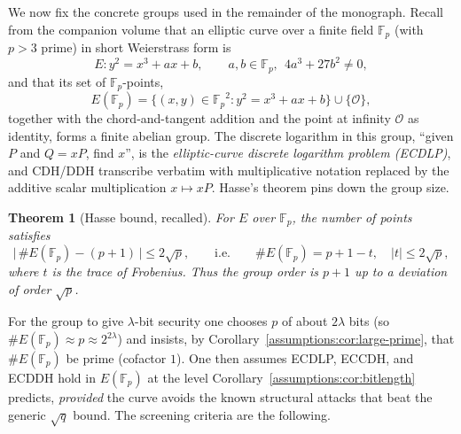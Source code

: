\documentclass[11pt,a4paper]{article}
\newtheorem{theorem}{Theorem}[section]
\theoremstyle{definition}
\theoremstyle{remark}
\newcommand{\Fp}{\ensuremath{\mathbb{F}_{p}}}
\begin{document}
We now fix the concrete groups used in the remainder of the monograph. Recall from the companion volume that an elliptic curve over a finite field \(\Fp\) (with \(p > 3\) prime) in short Weierstrass form is
\[
E \colon y^2 = x^3 + ax + b, \qquad a, b \in \Fp,\ \ 4a^3 + 27 b^2 \ne 0,
\]
and that its set of \(\Fp\)-points,
\[
E(\Fp) = \{(x,y) \in \Fp^2 : y^2 = x^3 + ax + b\} \cup \{\mathcal O\},
\]
together with the chord-and-tangent addition and the point at infinity \(\mathcal O\) as identity, forms a finite abelian group. The discrete logarithm in this group, ``given \(P\) and \(Q = xP\), find \(x\)'', is the \emph{elliptic-curve discrete logarithm problem (ECDLP)}, and CDH/DDH transcribe verbatim with multiplicative notation replaced by the additive scalar multiplication \(x \mapsto xP\). Hasse's theorem pins down the group size.

\begin{theorem}[Hasse bound, recalled]
\label{assumptions:thm:hasse}
For \(E\) over \(\Fp\), the number of points satisfies
\[
\bigl|\, \#E(\Fp) - (p+1) \,\bigr| \le 2\sqrt p,
\qquad\text{i.e.}\qquad
\#E(\Fp) = p + 1 - t, \quad |t| \le 2\sqrt p,
\]
where \(t\) is the \emph{trace of Frobenius}. Thus the group order is \(p+1\) up to a deviation of order \(\sqrt p\).
\end{theorem}

For the group to give \(\lambda\)-bit security one chooses \(p\) of about \(2\lambda\) bits (so \(\#E(\Fp) \approx p \approx 2^{2\lambda}\)) and insists, by Corollary~\ref{assumptions:cor:large-prime}, that \(\#E(\Fp)\) be prime (cofactor \(1\)). One then assumes ECDLP, ECCDH, and ECDDH hold in \(E(\Fp)\) at the level Corollary~\ref{assumptions:cor:bitlength} predicts, \emph{provided} the curve avoids the known structural attacks that beat the generic \(\sqrt q\) bound. The screening criteria are the following.
\end{document}
